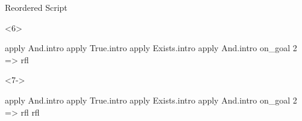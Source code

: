 \begin{frame}[fragile]
\begin{columns}[onlytextwidth,t]
\begin{column}{.38\textwidth}
\begin{block}{Reordered Script}
\begin{onlyenv}
\begin{leancode}[highlightlines=4]
          \end{leancode}
        \end{onlyenv}
        \begin{onlyenv}<6>
          \begin{leancode}[highlightlines=5]
            apply And.intro
            apply True.intro
            apply Exists.intro
            apply And.intro
            on_goal 2 => rfl

          \end{leancode}
        \end{onlyenv}
        \begin{onlyenv}<7->
          \begin{leancode}[highlightlines=6]
            apply And.intro
            apply True.intro
            apply Exists.intro
            apply And.intro
            on_goal 2 => rfl
            rfl
          \end{leancode}
        \end{onlyenv}
      \end{block}
    \end{column}
  \end{columns}
\end{frame}

